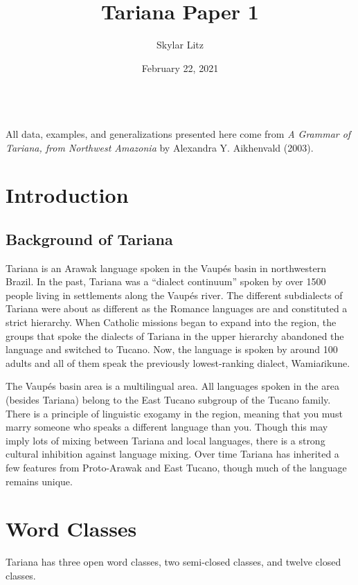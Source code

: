 \documentclass{article}
\title{Tariana Paper 1}
\author{Skylar Litz}
\date{February 22, 2021}
\begin{document}
\maketitle
\\

\noindent All data, examples, and generalizations presented here come from \textit{A Grammar of Tariana, from Northwest Amazonia} by Alexandra Y. Aikhenvald (2003).

\section{Introduction}
\subsection{Background of Tariana}
  Tariana is an Arawak language spoken in the Vaupés basin in northwestern Brazil. In the past, Tariana was a ``dialect continuum'' spoken by over 1500 people living in settlements along the Vaupés river. The different subdialects of Tariana were about as different as the Romance languages are and constituted a strict hierarchy. When Catholic missions began to expand into the region, the groups that spoke the dialects of Tariana in the upper hierarchy abandoned the language and switched to Tucano. Now, the language is spoken by around 100 adults and all of them speak the previously lowest-ranking dialect, Wamiaɾikune.

	The Vaupés basin area is a multilingual area. All languages spoken in the area (besides Tariana) belong to the East Tucano subgroup of the Tucano family. There is a principle of linguistic exogamy in the region, meaning that you must marry someone who speaks a different language than you. Though this may imply lots of mixing between Tariana and local languages, there is a strong cultural inhibition against language mixing. Over time Tariana has inherited a few features from Proto-Arawak and East Tucano, though much of the language remains unique.


\section{Word Classes}
Tariana has three open word classes, two semi-closed classes, and twelve closed classes.
\end{document}
